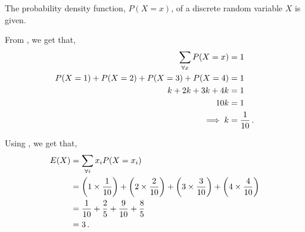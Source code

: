 %
%


\begin{subquestions}
	
\subquestion

The probability density function, $P(X=x)$, of a discrete random variable $X$ is given.

\begin{subsubquestions}
	
\subsubquestion

From , we get that,
\begin{align}
	\sum_{\forall x}P(X=x) & = 1 \nonumber \\
	P(X=1)+P(X=2)+P(X=3)+P(X=4) & = 1 \nonumber \\
	k+2k+3k+4k & = 1 \nonumber \\
	10k & = 1 \nonumber \\
	\implies k & = \frac{1}{10} \,.
\end{align}
	

\subsubquestion

Using , we get that,
\begin{align}
	E(X) & = \sum_{\forall i} x_i P(X=x_i) \nonumber \\
	     & = \left(1 \times \frac{1}{10}\right) + \left(2 \times \frac{2}{10}\right) + \left(3 \times \frac{3}{10}\right) + \left(4 \times \frac{4}{10}\right) \nonumber \\
	     & = \frac{1}{10} + \frac{2}{5} + \frac{9}{10} + \frac{8}{5} \nonumber \\
	     & = 3 \,.
\end{align}



\end{subsubquestions}
\end{subquestions}
